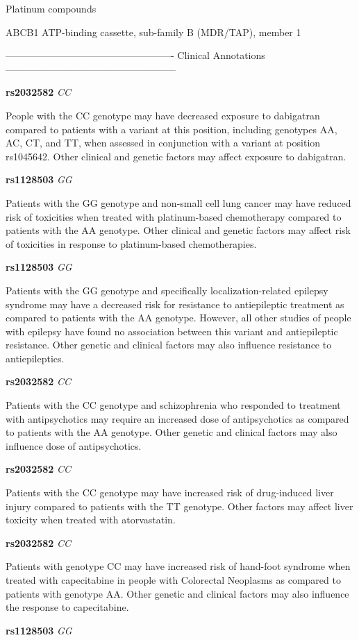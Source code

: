 \documentclass{resume} %
\begin{document}
\begin{rSection}{ Platinum compounds }
\begin{rSubsection}{ ABCB1 }{ ATP-binding cassette, sub-family B (MDR/TAP), member 1 }{}{}
\item[] ---------------------------------------------------- Clinical Annotations -----------------------------------------------------\newline
\item \textbf{ rs2032582 } \textit{ CC }
\item[] People with the CC genotype may have decreased exposure to dabigatran compared to patients with a variant at this position, including genotypes AA, AC, CT, and TT, when assessed in conjunction with a variant at position rs1045642. Other clinical and genetic factors may affect exposure to dabigatran. \item \textbf{ rs1128503 } \textit{ GG }
\item[] Patients with the GG genotype and non-small cell lung cancer may have reduced risk of toxicities when treated with platinum-based chemotherapy compared to patients with the AA genotype. Other clinical and genetic factors may affect risk of toxicities in response to platinum-based chemotherapies.\item \textbf{ rs1128503 } \textit{ GG }
\item[] Patients with the GG genotype and specifically localization-related epilepsy syndrome may have a decreased risk for resistance to antiepileptic treatment as compared to patients with the AA genotype. However, all other studies of people with epilepsy have found no association between this variant and antiepileptic resistance. Other genetic and clinical factors may also influence resistance to antiepileptics. \item \textbf{ rs2032582 } \textit{ CC }
\item[] Patients with the CC genotype and schizophrenia who responded to treatment with antipsychotics may require an increased dose of antipsychotics as compared to patients with the AA genotype. Other genetic and clinical factors may also influence dose of antipsychotics.\item \textbf{ rs2032582 } \textit{ CC }
\item[] Patients with the CC genotype may have increased risk of drug-induced liver injury compared to patients with the TT genotype. Other factors may affect liver toxicity when treated with atorvastatin.\item \textbf{ rs2032582 } \textit{ CC }
\item[] Patients with genotype CC may have increased risk of hand-foot syndrome when treated with capecitabine in people with Colorectal Neoplasms as compared to patients with genotype AA. Other genetic and clinical factors may also influence the response to capecitabine.\item \textbf{ rs1128503 } \textit{ GG }

\end{rSubsection}
\end{rSection}
\end{document}
